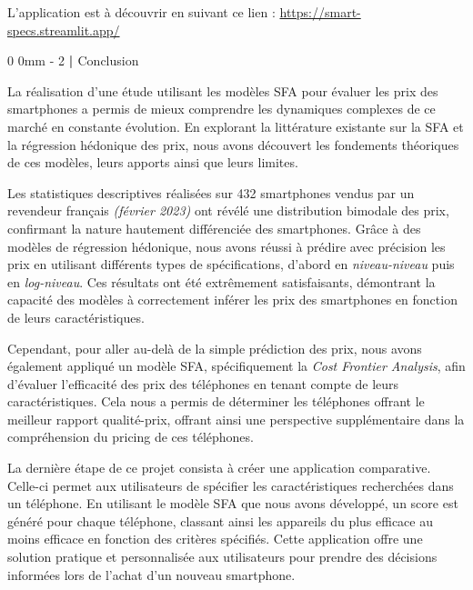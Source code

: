 \documentclass[
  12pt,
]{report}
\makeatletter
\renewcommand{\chapter}{%
    \clearpage %
    \@startsection{chapter}%
    {0} %
    {0mm} %
    {-\baselineskip} %
    {2\baselineskip} %
    {\normalfont\Huge\bfseries | \Huge\bfseries}%
}
\makeatother
\begin{document}
\begin{tcolorbox}[enhanced jigsaw, bottomrule=.15mm, toprule=.15mm, colback=white, opacitybacktitle=0.6, leftrule=.75mm, colframe=quarto-callout-tip-color-frame, colbacktitle=quarto-callout-tip-color!10!white, left=2mm, bottomtitle=1mm, opacityback=0, rightrule=.15mm, coltitle=black, toptitle=1mm, titlerule=0mm, title=\textcolor{quarto-callout-tip-color}{\faLightbulb}\hspace{0.5em}{Lien de l'application déployée}, arc=.35mm, breakable]

L'application est à découvrir en suivant ce lien :
\url{https://smart-specs.streamlit.app/}

\end{tcolorbox}

\chapter{Conclusion}\label{conclusion-2}

La réalisation d'une étude utilisant les modèles SFA pour évaluer les
prix des smartphones a permis de mieux comprendre les dynamiques
complexes de ce marché en constante évolution. En explorant la
littérature existante sur la SFA et la régression hédonique des prix,
nous avons découvert les fondements théoriques de ces modèles, leurs
apports ainsi que leurs limites.

Les statistiques descriptives réalisées sur 432 smartphones vendus par
un revendeur français \emph{(février 2023)} ont révélé une distribution
bimodale des prix, confirmant la nature hautement différenciée des
smartphones. Grâce à des modèles de régression hédonique, nous avons
réussi à prédire avec précision les prix en utilisant différents types
de spécifications, d'abord en \emph{niveau-niveau} puis en
\emph{log-niveau}. Ces résultats ont été extrêmement satisfaisants,
démontrant la capacité des modèles à correctement inférer les prix des
smartphones en fonction de leurs caractéristiques.

Cependant, pour aller au-delà de la simple prédiction des prix, nous
avons également appliqué un modèle SFA, spécifiquement la \emph{Cost
Frontier Analysis}, afin d'évaluer l'efficacité des prix des téléphones
en tenant compte de leurs caractéristiques. Cela nous a permis de
déterminer les téléphones offrant le meilleur rapport qualité-prix,
offrant ainsi une perspective supplémentaire dans la compréhension du
pricing de ces téléphones.

La dernière étape de ce projet consista à créer une application
comparative. Celle-ci permet aux utilisateurs de spécifier les
caractéristiques recherchées dans un téléphone. En utilisant le modèle
SFA que nous avons développé, un score est généré pour chaque téléphone,
classant ainsi les appareils du plus efficace au moins efficace en
fonction des critères spécifiés. Cette application offre une solution
pratique et personnalisée aux utilisateurs pour prendre des décisions
informées lors de l'achat d'un nouveau smartphone.
\end{document}
